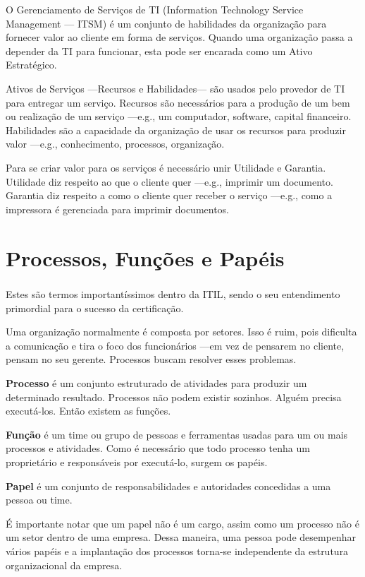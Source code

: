 O Gerenciamento de Serviços de TI (Information Technology Service Management
--- ITSM) é um conjunto de habilidades da organização para fornecer valor ao
cliente em forma de serviços. Quando uma organização passa a depender da TI
para funcionar, esta pode ser encarada como um Ativo Estratégico.
%

Ativos de Serviços ---Recursos e Habilidades--- são usados pelo provedor de TI
para entregar um serviço. Recursos são necessários para a produção de um bem ou
realização de um serviço ---e.g., um computador, software, capital financeiro.
Habilidades são a capacidade  da organização de usar os recursos para produzir
valor ---e.g., conhecimento, processos, organização.

Para se criar valor para os serviços é necessário unir Utilidade e Garantia.
Utilidade diz respeito ao que o cliente quer ---e.g., imprimir um documento.
Garantia diz respeito a como o cliente quer receber o serviço ---e.g., como a
impressora é gerenciada para imprimir documentos.


\section{Processos, Funções e Papéis}
\label{sec:funda:proc}

Estes são termos importantíssimos dentro da
ITIL\textsuperscript{\textregistered}, sendo o seu entendimento primordial para
o sucesso da certificação.

Uma organização normalmente é composta por setores. Isso é ruim, pois dificulta
a comunicação e tira o foco dos funcionários ---em vez de pensarem no cliente,
pensam no seu gerente. Processos buscam resolver esses problemas.

\textbf{Processo} é um conjunto estruturado de atividades para produzir um
determinado resultado. Processos não podem existir sozinhos. Alguém precisa
executá-los. Então existem as funções.

\textbf{Função} é um time ou grupo de pessoas e ferramentas usadas para um ou
mais processos e atividades. Como é necessário que todo processo tenha um
proprietário e responsáveis por executá-lo, surgem os papéis.

\textbf{Papel} é um conjunto de responsabilidades e autoridades concedidas a
uma pessoa ou time.

É importante notar que  um papel não é um cargo, assim como um processo não é
um setor dentro de uma empresa. Dessa maneira, uma pessoa pode desempenhar
vários papéis e a implantação dos processos torna-se independente da estrutura
organizacional da empresa.


